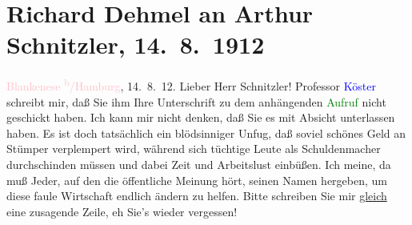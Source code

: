 

               \section[Richard Dehmel an Arthur Schnitzler, 14. 8. 1912]{ Richard Dehmel an Arthur Schnitzler, 14. 8. 1912}\nopagebreak{}\rehead{ }\normalsize\beginnumbering{} \toendnotes[C]{\smallbreak\pagebreak[2]} 
\toendnotes[C]{\smallbreak}\pstart
           {\pb}\textcolor{pink}{Blankenese \textsuperscript{b}/Hamburg}{}\ledrightnote{\textcolor{pink}{Blankenese}}, 14. 8. 12. \pend
           \pstart{}Lieber Herr Schnitzler!\pend\pstart
           Professor \textcolor{blue}{Köster}{}\ledrightnote{\textcolor{blue}{Albert Köster}} schreibt mir, daß Sie ihm
                    Ihre Unterschrift zu dem anhängenden \textcolor{green}{Aufruf}{} nicht geschickt haben. Ich kann mir nicht
                    denken, daß Sie es mit Absicht unterlassen haben. Es ist doch tatsächlich ein
                    blödsinniger Unfug, daß soviel schönes Geld an Stümper verplempert wird, während
                    sich tüchtige Leute als Schuldenmacher durchschinden müssen und dabei Zeit und
                    Arbeitslust einbüßen. Ich meine, da muß Jeder, auf den die öffentliche Meinung
                    hört, seinen Namen hergeben, um diese faule Wirtschaft endlich ändern zu helfen.
                    Bitte schreiben Sie mir \uline{gleich} eine zusagende
                    Zeile, eh Sie’s wieder vergessen! \pend
